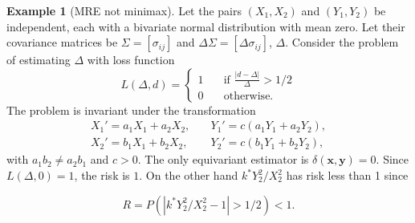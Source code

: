 \documentclass{article}
\theoremstyle{plain}
\theoremstyle{definition}
\newtheorem{example}{Example}
\begin{document}
\begin{example}[MRE not minimax]
    Let the pairs $(X_1,X_2)$ and $(Y_1,Y_2)$ be independent, each with a bivariate normal distribution with mean zero.
    Let their covariance matrices be $\Sigma=[\sigma_{ij}]$ and $\Delta \Sigma=[\Delta \sigma_{ij}]$, $\Delta$.
    Consider the problem of estimating $\Delta$ with loss function
    \begin{equation*}
        L(\Delta,d)=\left\{
            \begin{aligned}
                1\quad & \textrm{if $\frac{|d-\Delta|}{\Delta}>1/2$}\\
                0\quad & \textrm{otherwise}.
            \end{aligned}
            \right.
    \end{equation*}
    The problem is invariant under the transformation
    \begin{equation*}
            \begin{aligned}
                X_1'=a_1 X_1+a_2 X_2,\quad &Y_1'=c(a_1Y_1+a_2 Y_2),\\
                X_2'=b_1 X_1+b_2 X_2,\quad &Y_2'=c(b_1Y_1+b_2 Y_2),
            \end{aligned}
    \end{equation*}
    with $a_1 b_2\neq a_2 b_1$ and $c>0$.
    The only equivariant estimator is $\delta(\mathbf{x},\mathbf{y})=0$.
   Since $L(\Delta,0)=1$, the risk is $1$.
    On the other hand $k^* Y_2^2/X_2^2$ has risk less than 1 since

    \begin{equation*}
        R=P(|k^* Y_2^2/X_2^2-1|>1/2)<1.
    \end{equation*}
\end{example}
\end{document}
